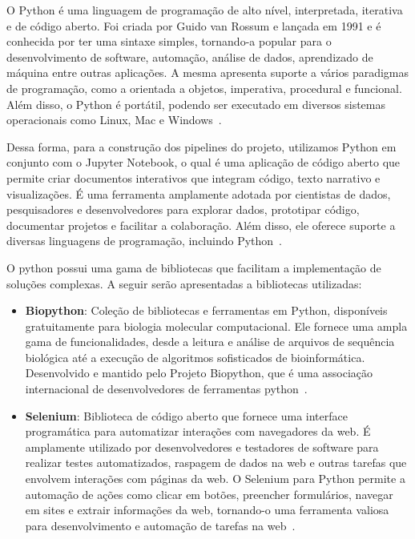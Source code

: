 O Python é uma linguagem de programação de alto nível, interpretada, iterativa e de código aberto. Foi criada por Guido van Rossum e lançada em 1991 e é conhecida por ter uma sintaxe simples, tornando-a popular para o desenvolvimento de software, automação, análise de dados, aprendizado de máquina entre outras aplicações. A mesma apresenta suporte a vários paradigmas de programação, como a orientada a objetos, imperativa, procedural e funcional. Além disso, o Python é portátil, podendo ser executado em diversos sistemas operacionais como Linux, Mac e Windows~\cite{python-reference}.

Dessa forma, para a construção dos pipelines do projeto, utilizamos Python em conjunto com o Jupyter Notebook, o qual é uma aplicação de código aberto que permite criar documentos interativos que integram código, texto narrativo e visualizações. É uma ferramenta amplamente adotada por cientistas de dados, pesquisadores e desenvolvedores para explorar dados, prototipar código, documentar projetos e facilitar a colaboração. Além disso, ele oferece suporte a diversas linguagens de programação, incluindo Python~\cite{jupyter-notebook}.

O python possui uma gama de bibliotecas que facilitam a implementação de soluções complexas. A seguir serão apresentadas a bibliotecas utilizadas:

\begin{itemize}
  \item \textbf{Biopython}: Coleção de bibliotecas e ferramentas em Python, disponíveis gratuitamente para biologia molecular computacional. Ele fornece uma ampla gama de funcionalidades, desde a leitura e análise de arquivos de sequência biológica até a execução de algoritmos sofisticados de bioinformática. Desenvolvido e mantido pelo Projeto Biopython, que é uma associação internacional de desenvolvedores de ferramentas python~\cite{biopython}.
  \item \textbf{Selenium}: Biblioteca de código aberto que fornece uma interface programática para automatizar interações com navegadores da web. É amplamente utilizado por desenvolvedores e testadores de software para realizar testes automatizados, raspagem de dados na web e outras tarefas que envolvem interações com páginas da web. O Selenium para Python permite a automação de ações como clicar em botões, preencher formulários, navegar em sites e extrair informações da web, tornando-o uma ferramenta valiosa para desenvolvimento e automação de tarefas na web~\cite{selenium-python}.
\end{itemize}

